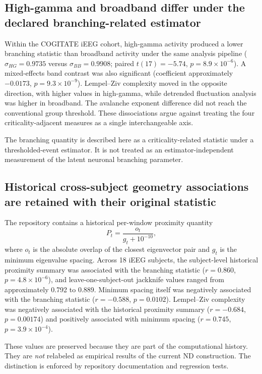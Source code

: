 \documentclass[preprint,12pt,nonatbib]{elsarticle}
\begin{document}
\subsection{High-gamma and broadband differ under the declared branching-related estimator}
Within the COGITATE iEEG cohort, high-gamma activity produced a lower branching statistic than broadband activity under the same analysis pipeline ($\sigma_{HG}=0.9735$ versus $\sigma_{BB}=0.9908$; paired $t(17)=-5.74$, $p=8.9\times10^{-6}$). A mixed-effects band contrast was also significant (coefficient approximately $-0.0173$, $p=9.3\times10^{-9}$). Lempel--Ziv complexity moved in the opposite direction, with higher values in high-gamma, while detrended fluctuation analysis was higher in broadband. The avalanche exponent difference did not reach the conventional group threshold. These dissociations argue against treating the four criticality-adjacent measures as a single interchangeable axis.

The branching quantity is described here as a criticality-related statistic under a thresholded-event estimator. It is not treated as an estimator-independent measurement of the latent neuronal branching parameter.

\subsection{Historical cross-subject geometry associations are retained with their original statistic}
The repository contains a historical per-window proximity quantity
\begin{equation}
P_t = \frac{o_t}{g_t + 10^{-10}},
\end{equation}
where $o_t$ is the absolute overlap of the closest eigenvector pair and $g_t$ is the minimum eigenvalue spacing. Across 18 iEEG subjects, the subject-level historical proximity summary was associated with the branching statistic ($r=0.860$, $p=4.8\times10^{-6}$), and leave-one-subject-out jackknife values ranged from approximately 0.792 to 0.889. Minimum spacing itself was negatively associated with the branching statistic ($r=-0.588$, $p=0.0102$). Lempel--Ziv complexity was negatively associated with the historical proximity summary ($r=-0.684$, $p=0.00174$) and positively associated with minimum spacing ($r=0.745$, $p=3.9\times10^{-4}$).

These values are preserved because they are part of the computational history. They are \emph{not} relabeled as empirical results of the current ND construction. The distinction is enforced by repository documentation and regression tests.
\end{document}
